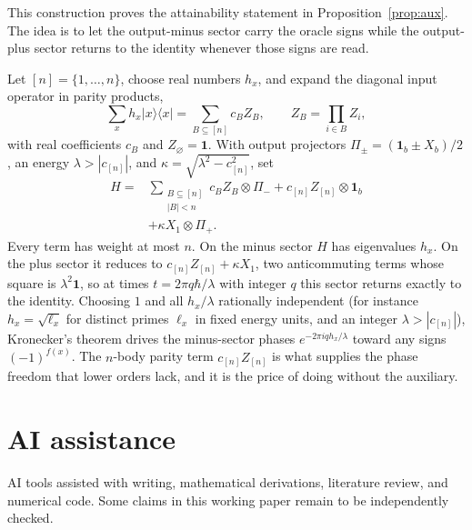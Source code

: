 \documentclass[11pt,a4paper]{article}
\providecommand{\openone}{\mathbf{1}}
\newcommand{\ket}[1]{\lvert #1\rangle}
\newcommand{\bra}[1]{\langle #1\rvert}
\newcommand{\id}{\openone}
\begin{document}
This construction proves the attainability statement in Proposition~\ref{prop:aux}. The idea is to let the output-minus sector carry the oracle signs while the output-plus sector returns to the identity whenever those signs are read.

Let $[n]=\{1,\ldots,n\}$, choose real numbers $h_x$, and expand the diagonal input operator in parity products,
\begin{equation}
 \sum_xh_x\ket x\bra x=\sum_{B\subseteq[n]}c_BZ_B,
 \qquad Z_B=\prod_{i\in B}Z_i,
\end{equation}
with real coefficients $c_B$ and $Z_\varnothing=\id$. With output projectors $\Pi_\pm=(\id_b\pm X_b)/2$, an energy $\lambda>|c_{[n]}|$, and $\kappa=\sqrt{\lambda^2-c_{[n]}^2}$, set
\begin{equation}
 \begin{aligned}
 H={}&\sum_{\substack{B\subseteq[n]\\ |B|<n}}c_BZ_B\otimes\Pi_-
       +c_{[n]}Z_{[n]}\otimes\id_b\\
     &+\kappa X_1\otimes\Pi_+ .
 \end{aligned}
\end{equation}
Every term has weight at most $n$. On the minus sector $H$ has eigenvalues $h_x$. On the plus sector it reduces to $c_{[n]}Z_{[n]}+\kappa X_1$, two anticommuting terms whose square is $\lambda^2\id$, so at times $t=2\pi q\hbar/\lambda$ with integer $q$ this sector returns exactly to the identity. Choosing $1$ and all $h_x/\lambda$ rationally independent (for instance $h_x=\sqrt{\ell_x}$ for distinct primes $\ell_x$ in fixed energy units, and an integer $\lambda>|c_{[n]}|$), Kronecker's theorem drives the minus-sector phases $e^{-2\pi iqh_x/\lambda}$ toward any signs $(-1)^{f(x)}$. The $n$-body parity term $c_{[n]}Z_{[n]}$ is what supplies the phase freedom that lower orders lack, and it is the price of doing without the auxiliary.

\section*{AI assistance}
AI tools assisted with writing, mathematical derivations, literature review, and numerical code. Some claims in this working paper remain to be independently checked.



\end{document}
